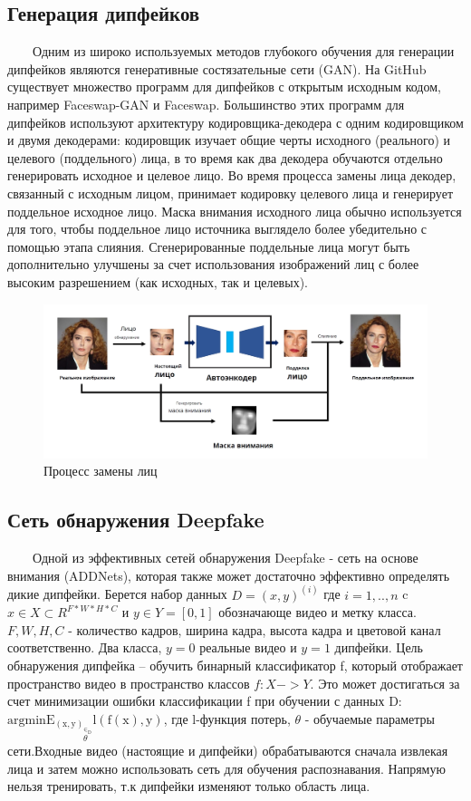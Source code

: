 \documentclass[12pt]{article}
\begin{document}
    \subsection{Генерация дипфейков}
        $\qquad$Одним из широко используемых методов глубокого обучения для генерации дипфейков являются генеративные состязательные сети (GAN). На GitHub существует множество программ для дипфейков с открытым исходным кодом, например Faceswap-GAN и Faceswap. Большинство этих программ для дипфейков используют архитектуру кодировщика-декодера с одним кодировщиком и двумя декодерами: кодировщик изучает общие черты исходного (реального) и целевого (поддельного) лица, в то время как два декодера обучаются отдельно генерировать исходное и целевое лицо. Во время процесса замены лица декодер, связанный с исходным лицом, принимает кодировку целевого лица и генерирует поддельное исходное лицо. Маска внимания исходного лица обычно используется для того, чтобы поддельное лицо источника выглядело более убедительно с помощью этапа слияния. Сгенерированные поддельные лица могут быть дополнительно улучшены за счет использования изображений лиц с более высоким разрешением (как исходных, так и целевых).
        \newline
        \begin{figure}[h!]
            \centering
            \includegraphics[width = 500 pt] {18.jpg}
            \caption{Процесс замены лиц}
        \end{figure}
        \newline
    \subsection{Сеть обнаружения Deepfake}
        $\qquad$Одной из эффективных сетей обнаружения Deepfake - сеть на основе внимания (ADDNets), которая также может достаточно эффективно определять дикие дипфейки.
        Берется набор данных $D = {(x,y)^(i)}$ где $i=1,..,n$ c $x \in X \subset R^{F*W*H*C}$ и $y \in Y = [0, 1]$ обозначающе видео и метку класса. $F,W,H,C$ - количество кадров, ширина кадра, высота кадра и цветовой канал соответственно. Два класса, $y=0$ реальные видео и $y=1$ дипфейки. Цель обнаружения дипфейка – обучить бинарный классификатор f, который отображает пространство видео в пространство классов $f: X-> Y$. Это может достигаться за счет минимизации ошибки классификации f при обучении с данных D: $\underset{\theta}{\operatorname{argmin E_(x,y)_\in_D l(f(x),y)}} $, где l-функция потерь, $\theta$ - обучаемые параметры сети.Входные видео (настоящие и дипфейки) обрабатываются сначала извлекая лица и затем можно использовать сеть для обучения распознавания. Напрямую нельзя тренировать, т.к дипфейки изменяют только область лица. 
\end{document}
